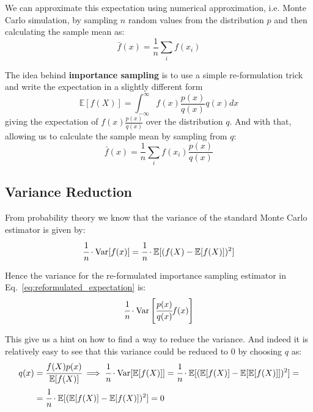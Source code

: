 \documentclass[12pt,a4paper]{article}
\begin{document}
We can approximate this expectation using numerical approximation, i.e. Monte Carlo simulation, by sampling $n$ random values from the distribution $p$ and then calculating the sample mean as:
\begin{equation}
\bar{f}(x) = \frac{1}{n}\sum_i f(x_i)
\end{equation}

The idea behind \textbf{importance sampling} is to use a simple re-formulation trick and write the expectation in a slightly different form
\begin{equation}
\mathbb{E}[f(X)] = \int_{-\infty}^\infty f(x)\frac{p(x)}{q(x)}q(x)dx
\end{equation}
giving the expectation of $f(x)\frac{p(x)}{q(x)}$ over the distribution $q$. And with that, allowing us to calculate the sample mean by sampling from $q$:
\begin{equation}
\bar{f}(x) = \frac{1}{n}\sum_i f(x_i)\frac{p(x)}{q(x)}
\label{eq:reformulated_expectation}
\end{equation}

\subsection{Variance Reduction}
From probability theory we know that the variance of the standard Monte Carlo estimator is given by:
\begin{equation}
\cfrac{1}{n}\cdot\text{Var}[f(x)] = \cfrac{1}{n}\cdot\mathbb{E}[(f(X)-\mathbb{E}[f(X)])^2]
\end{equation}

Hence the variance for the re-formulated importance sampling estimator in Eq.~\ref{eq:reformulated_expectation} is:
\begin{equation}
\cfrac{1}{n}\cdot\text{Var}\left[\cfrac{p(x)}{q(x)}f(x)\right]
\end{equation}

This give us a hint on how to find a way to reduce the variance. And indeed it is relatively easy to see that this variance could be reduced to 0 by choosing $q$ as:
\begin{equation}
\begin{aligned}
q(x)&=\cfrac{f(X)p(x)}{\mathbb{E}[f(X)]} \implies \cfrac{1}{n}\cdot\text{Var}[\mathbb{E}[f(X)]] = \cfrac{1}{n}\cdot\mathbb{E}[(\mathbb{E}[f(X)]-\mathbb{E}[\mathbb{E}[f(X)]])^2]=\\
&=\cfrac{1}{n}\cdot\mathbb{E}[(\mathbb{E}[f(X)]-\mathbb{E}[f(X)])^2] = 0
\end{aligned}
\end{equation}
\end{document}
